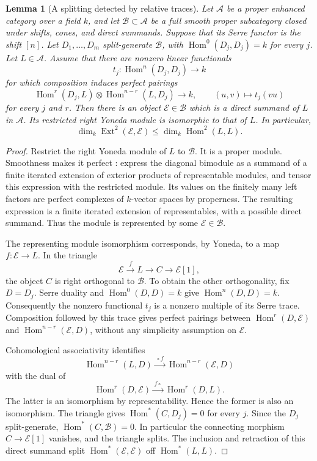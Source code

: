 \documentclass[11pt]{article}
\numberwithin{equation}{section}
\newtheorem{lemma}[theorem]{Lemma}
\theoremstyle{definition}
\theoremstyle{remark}
\newcommand{\Ext}{\operatorname{Ext}}
\newcommand{\Hom}{\operatorname{Hom}}
\begin{document}
\begin{lemma}[A splitting detected by relative traces]
\label{lem:trace-splitting}
Let $\mathcal A$ be a proper enhanced category over a field $k$, and let
$\mathcal B\subset\mathcal A$ be a full smooth proper subcategory closed
under shifts, cones, and direct summands.  Suppose that its Serre functor
is the shift $[n]$.  Let $D_1,\ldots,D_m$ split-generate $\mathcal B$,
with $\Hom^0(D_j,D_j)=k$ for every $j$.  Let $L\in\mathcal A$.
Assume that there are nonzero linear functionals
\[
             t_j:\Hom^n(D_j,D_j)\longrightarrow k
\]
for which composition induces perfect pairings
\[
 \Hom^r(D_j,L)\otimes\Hom^{n-r}(L,D_j)
      \longrightarrow k,\qquad (u,v)\longmapsto t_j(vu)
\]
for every $j$ and $r$.
Then there is an object $\mathcal E\in\mathcal B$ which is a direct
summand of $L$ in $\mathcal A$.  Its restricted right Yoneda module is
isomorphic to that of $L$.  In particular,
\[
 \dim_k\Ext^2(\mathcal E,\mathcal E)
          \leq \dim_k\Hom^2(L,L).
\]
\end{lemma}

\begin{proof}
Restrict the right Yoneda module of $L$ to $\mathcal B$.
It is a proper module.  Smoothness makes it perfect
\cite[Lemma~2.8 and Corollary~2.9]{History:ToenVaquie}: express the
diagonal bimodule as a summand of a finite iterated extension of exterior
products of representable modules, and tensor this expression with the
restricted module.  Its values on the finitely many left factors are
perfect complexes of $k$-vector spaces by properness.  The resulting
expression is a finite iterated extension of representables, with a
possible direct summand.  Thus the module is represented by some
$\mathcal E\in\mathcal B$.

The representing module isomorphism corresponds, by Yoneda, to a map
$f:\mathcal E\to L$.  In the triangle
\[
                 \mathcal E\xrightarrow{f} L\longrightarrow C
                       \longrightarrow\mathcal E[1],
\]
the object $C$ is right orthogonal to $\mathcal B$.
To obtain the other orthogonality, fix $D=D_j$.
Serre duality and $\Hom^0(D,D)=k$ give
$\Hom^n(D,D)=k$.  Consequently the nonzero functional $t_j$ is a
nonzero multiple of its Serre trace.  Composition followed by this
trace gives perfect pairings between $\Hom^r(D,\mathcal E)$ and
$\Hom^{n-r}(\mathcal E,D)$, without any simplicity assumption on
$\mathcal E$.

Cohomological associativity identifies
\[
 \Hom^{n-r}(L,D)\xrightarrow{\,\circ f\,}
       \Hom^{n-r}(\mathcal E,D)
\]
with the dual of
\[
 \Hom^r(D,\mathcal E)\xrightarrow{\,f\circ\,}\Hom^r(D,L).
\]
The latter is an isomorphism by representability.  Hence the former is
also an isomorphism.  The triangle gives $\Hom^*(C,D_j)=0$ for every
$j$.  Since the $D_j$ split-generate, $\Hom^*(C,\mathcal B)=0$.
In particular the connecting morphism $C\to\mathcal E[1]$ vanishes,
and the triangle splits.  The inclusion and retraction of this direct
summand split $\Hom^*(\mathcal E,\mathcal E)$ off $\Hom^*(L,L)$.
\end{proof}
\end{document}
